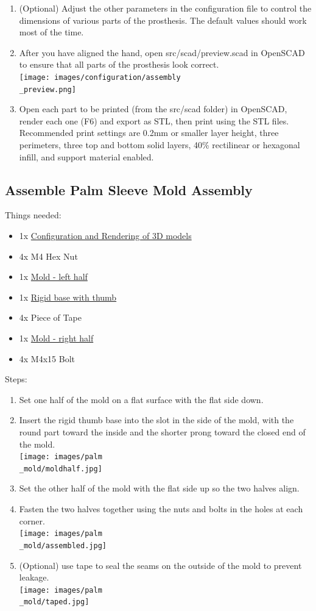 \documentclass[11pt]{article}
\begin{document}
\begin{enumerate}
\item (Optional) Adjust the other parameters in the configuration file to control the dimensions of various parts of the prosthesis. The default values should work most of the time.
\item After you have aligned the hand, open src/scad/preview.scad in OpenSCAD to ensure that all parts of the prosthesis look correct.\\ \texttt{[image: images/configuration/assembly\\\_preview.png]}
\item Open each part to be printed (from the src/scad folder) in OpenSCAD, render each one (F6) and export as STL, then print using the STL files. Recommended print settings are 0.2mm or smaller layer height, three perimeters, three top and bottom solid layers, 40\% rectilinear or hexagonal infill, and support material enabled.
\end{enumerate}

\subsection{Assemble Palm Sleeve Mold Assembly}
Things needed:
\begin{itemize}
\item 1x \hyperlink{thing_config\_file}{Configuration and Rendering of 3D models}
\item 4x M4 Hex Nut
\item 1x \hyperlink{thing_mold\_left\_half}{Mold - left half}
\item 1x \hyperlink{thing_rigid\_base}{Rigid base with thumb}
\item 4x Piece of Tape
\item 1x \hyperlink{thing_mold\_right\_half}{Mold - right half}
\item 4x M4x15 Bolt
\end{itemize}
Steps:
\begin{enumerate}
\item Set one half of the mold on a flat surface with the flat side down.
\item Insert the rigid thumb base into the slot in the side of the mold, with the round part toward the inside and the shorter prong toward the closed end of the mold.\\ \texttt{[image: images/palm\\\_mold/moldhalf.jpg]}
\item Set the other half of the mold with the flat side up so the two halves align.
\item Fasten the two halves together using the nuts and bolts in the holes at each corner.\\ \texttt{[image: images/palm\\\_mold/assembled.jpg]}
\item (Optional) use tape to seal the seams on the outside of the mold to prevent leakage.\\ \texttt{[image: images/palm\\\_mold/taped.jpg]}
\end{enumerate}
\end{document}
